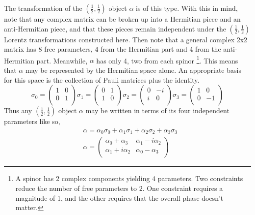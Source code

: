 The transformation of the $(\frac{1}{2}, \frac{1}{2})$ object $\alpha$ is of this type. With this in mind, note that any complex matrix can be broken up into a Hermitian piece and an anti-Hermitian piece, and that these pieces remain independent under the $(\frac{1}{2}, \frac{1}{2})$ Lorentz transformations constructed here. Then note that a general complex 2x2 matrix has 8 free parameters, 4 from the Hermitian part and 4 from the anti-Hermitian part. Meanwhile, $\alpha$ has only 4, two from each spinor \footnote{A spinor has 2 complex components yielding 4 parameters. Two constraints reduce the number of free parameters to 2. One constraint requires a magnitude of 1, and the other requires that the overall phase doesn't matter.}. This means that $\alpha$ may be represented by the Hermitian space alone. An appropriate basis for this space is the collection of Pauli matrices plus the identity.
\begin{equation}
\sigma_0 =  
\begin{pmatrix}
1 & 0 \\
0 & 1 \\
\end{pmatrix}
\sigma_1 =  
\begin{pmatrix}
0 & 1 \\
1 & 0 \\
\end{pmatrix}
\sigma_2 = 
\begin{pmatrix}
0 & -i \\
i & 0 \\
\end{pmatrix}
\sigma_3 = 
\begin{pmatrix}
1 & 0 \\
0 & -1 \\
\end{pmatrix}
\end{equation}
Thus any $(\frac{1}{2}, \frac{1}{2})$ object $\alpha$ may be written in terms of its four independent parameters like so, 
\begin{equation}
\begin{split}
&\alpha = \alpha_0 \sigma_0 + \alpha_1 \sigma_1 + \alpha_2 \sigma_2 + \alpha_3 \sigma_3 \\
&\alpha = 
\begin{pmatrix}
\alpha_0 + \alpha_3 & \alpha_1 - i\alpha_2 \\
\alpha_1 + i\alpha_2 & \alpha_0 - \alpha_3 \\
\end{pmatrix}
\end{split}
\end{equation}

